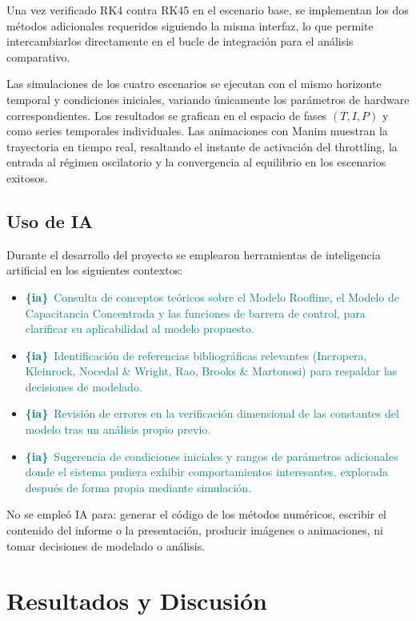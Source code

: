\documentclass[10pt, twocolumn]{article}
\newcommand{\ia}[1]{\textcolor{teal}{\textbf{\{ia\}}~#1}}
\begin{document}
Una vez verificado RK4 contra RK45 en el escenario base, se implementan los dos
métodos adicionales requeridos siguiendo la misma interfaz, lo que permite
intercambiarlos directamente en el bucle de integración para el análisis
comparativo.

Las simulaciones de los cuatro escenarios se ejecutan con el mismo horizonte
temporal y condiciones iniciales, variando únicamente los parámetros de hardware
correspondientes. Los resultados se grafican en el espacio de fases $(T, I, P)$
y como series temporales individuales. Las animaciones con Manim muestran la
trayectoria en tiempo real, resaltando el instante de activación del throttling,
la entrada al régimen oscilatorio y la convergencia al equilibrio en los escenarios
exitosos.

\subsection{Uso de IA}

Durante el desarrollo del proyecto se emplearon herramientas de inteligencia
artificial en los siguientes contextos:

\begin{itemize}
  \item \ia{Consulta de conceptos teóricos sobre el Modelo Roofline, el Modelo de
        Capacitancia Concentrada y las funciones de barrera de control, para
        clarificar su aplicabilidad al modelo propuesto.}
  \item \ia{Identificación de referencias bibliográficas relevantes (Incropera,
        Kleinrock, Nocedal \& Wright, Rao, Brooks \& Martonosi) para respaldar las
        decisiones de modelado.}
  \item \ia{Revisión de errores en la verificación dimensional de las constantes del
        modelo tras un análisis propio previo.}
  \item \ia{Sugerencia de condiciones iniciales y rangos de parámetros adicionales
        donde el sistema pudiera exhibir comportamientos interesantes, explorada
        después de forma propia mediante simulación.}
\end{itemize}

No se empleó IA para: generar el código de los métodos numéricos, escribir el
contenido del informe o la presentación, producir imágenes o animaciones, ni tomar
decisiones de modelado o análisis.

\section{Resultados y Discusión}
\label{sec:resultados}
\end{document}

